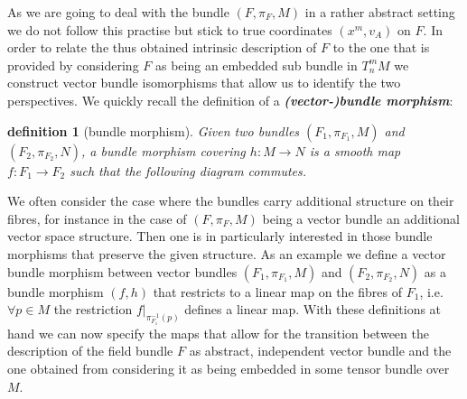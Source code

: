 \documentclass[a4paper,12pt, DIV=14, BCOR=5mm, twoside, headsepline]{scrbook}
\newtheorem{definition}{definition}[section]
\newtheorem*{remark}{Remark}
\begin{document}
As we are going to deal with the bundle $(F, \pi_F, M)$ in a rather abstract setting we do not follow this practise but stick to true coordinates $(x^m,v_A)$ on $F$. 
In order to relate the thus obtained intrinsic description of $F$ to the one that is provided by considering $F$ as being an embedded sub bundle in $T^m_n M$ we construct vector bundle isomorphisms that allow us to identify the two perspectives. We quickly recall the definition of a \textit{\textbf{(vector-)bundle morphism}}:
\begin{definition}[bundle morphism]
Given two bundles $(F_1, \pi_{F_1}, M)$ and $(F_2, \pi_{F_2}, N)$, a bundle morphism covering $h : M \rightarrow N$ is a smooth map $f : F_1 \rightarrow F_2$ such that the following diagram commutes.
\begin{center}
\end{center}
\end{definition}

We often consider the case where the bundles carry additional structure on their fibres, for instance in the case of $(F, \pi_F, M)$ being a vector bundle an additional vector space structure. Then one is in particularly interested in those bundle morphisms that preserve the given structure. As an example we define a vector bundle morphism between vector bundles $(F_1, \pi_{F_1}, M)$ and $(F_2, \pi_{F_2}, N)$ as a bundle morphism $(f,h)$ that restricts to a linear map on the fibres of $F_1$, i.e. $\forall p \in M$ the restriction $f \vert_{\pi_{F_1}^{-1}(p)}$ defines a linear map.
With these definitions at hand we can now specify the maps that allow for the transition between the description of the field bundle $F$ as abstract, independent vector bundle and the one obtained from considering it as being embedded in some tensor bundle over $M$.
\end{document}
